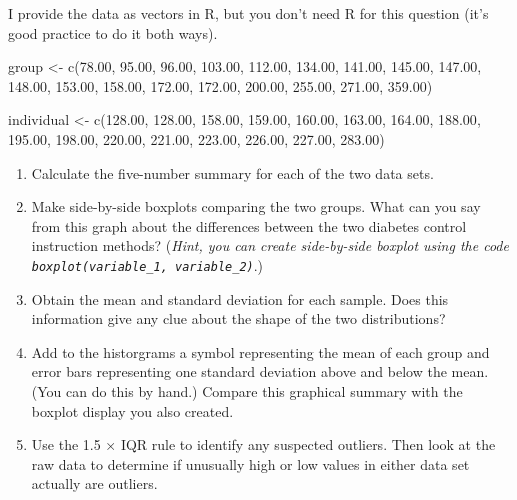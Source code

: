 \documentclass[
  letterpaper,
  DIV=11,
  numbers=noendperiod]{scrreprt}
\newenvironment{Shaded}{\begin{snugshade}}{\end{snugshade}}
\newcommand{\FloatTok}[1]{\textcolor[rgb]{0.68,0.00,0.00}{#1}}
\newcommand{\FunctionTok}[1]{\textcolor[rgb]{0.28,0.35,0.67}{#1}}
\newcommand{\NormalTok}[1]{\textcolor[rgb]{0.00,0.23,0.31}{#1}}
\newcommand{\OtherTok}[1]{\textcolor[rgb]{0.00,0.23,0.31}{#1}}
\providecommand{\tightlist}{%
  \setlength{\itemsep}{0pt}\setlength{\parskip}{0pt}}\usepackage{longtable,booktabs,array}
\begin{document}
I provide the data as vectors in R, but you don't need R for this
question (it's good practice to do it both ways).

\begin{Shaded}
\begin{Highlighting}[]
\NormalTok{group }\OtherTok{\textless{}{-}} \FunctionTok{c}\NormalTok{(}\FloatTok{78.00}\NormalTok{, }\FloatTok{95.00}\NormalTok{, }\FloatTok{96.00}\NormalTok{, }\FloatTok{103.00}\NormalTok{, }\FloatTok{112.00}\NormalTok{, }\FloatTok{134.00}\NormalTok{, }\FloatTok{141.00}\NormalTok{, }\FloatTok{145.00}\NormalTok{, }\FloatTok{147.00}\NormalTok{,}
    \FloatTok{148.00}\NormalTok{, }\FloatTok{153.00}\NormalTok{, }\FloatTok{158.00}\NormalTok{, }\FloatTok{172.00}\NormalTok{, }\FloatTok{172.00}\NormalTok{, }\FloatTok{200.00}\NormalTok{, }\FloatTok{255.00}\NormalTok{, }\FloatTok{271.00}\NormalTok{, }\FloatTok{359.00}\NormalTok{)}

\NormalTok{individual }\OtherTok{\textless{}{-}} \FunctionTok{c}\NormalTok{(}\FloatTok{128.00}\NormalTok{, }\FloatTok{128.00}\NormalTok{, }\FloatTok{158.00}\NormalTok{, }\FloatTok{159.00}\NormalTok{, }\FloatTok{160.00}\NormalTok{, }\FloatTok{163.00}\NormalTok{, }\FloatTok{164.00}\NormalTok{, }\FloatTok{188.00}\NormalTok{, }\FloatTok{195.00}\NormalTok{,}
    \FloatTok{198.00}\NormalTok{, }\FloatTok{220.00}\NormalTok{, }\FloatTok{221.00}\NormalTok{, }\FloatTok{223.00}\NormalTok{, }\FloatTok{226.00}\NormalTok{, }\FloatTok{227.00}\NormalTok{, }\FloatTok{283.00}\NormalTok{)}
\end{Highlighting}
\end{Shaded}

\begin{enumerate}
\def\labelenumi{\alph{enumi}.}
\tightlist
\item
  Calculate the five-number summary for each of the two data sets.
\item
  Make side-by-side boxplots comparing the two groups. What can you say
  from this graph about the differences between the two diabetes control
  instruction methods? (\emph{Hint, you can create side-by-side boxplot
  using the code \texttt{boxplot(variable\_1,\ variable\_2)}}.)
\item
  Obtain the mean and standard deviation for each sample. Does this
  information give any clue about the shape of the two distributions?
\item
  Add to the historgrams a symbol representing the mean of each group
  and error bars representing one standard deviation above and below the
  mean. (You can do this by hand.) Compare this graphical summary with
  the boxplot display you also created.
\item
  Use the 1.5 × IQR rule to identify any suspected outliers. Then look
  at the raw data to determine if unusually high or low values in either
  data set actually are outliers.
\end{enumerate}
\end{document}

